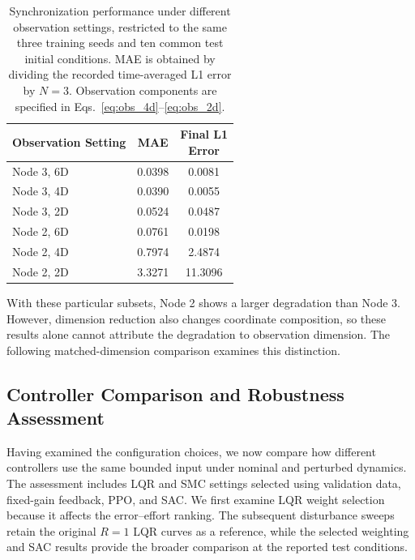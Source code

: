 \documentclass[a4paper,fleqn]{cas-dc}
\theoremstyle{plain}
\theoremstyle{definition}
\begin{document}
\begin{table}[pos=h,width=\linewidth]
	\centering
	\setlength{\tabcolsep}{3pt}
	\renewcommand{\arraystretch}{1.12}
	\caption{Synchronization performance under different observation settings, restricted to the same three training seeds and ten common test initial conditions. MAE is obtained by dividing the recorded time-averaged L1 error by $N=3$. Observation components are specified in Eqs.~\ref{eq:obs_4d}--\ref{eq:obs_2d}.}
	\label{tab:partial_observation}
	\begin{tabular}{@{}lcc@{}}
		\toprule
		Observation Setting & MAE & \makecell{Final L1\\Error} \\
		\midrule
		Node 3, 6D & 0.0398 & 0.0081 \\
		Node 3, 4D & 0.0390 & 0.0055 \\
		Node 3, 2D & 0.0524 & 0.0487 \\
		Node 2, 6D & 0.0761 & 0.0198 \\
		Node 2, 4D & 0.7974 & 2.4874 \\
		Node 2, 2D & 3.3271 & 11.3096 \\
		\bottomrule
	\end{tabular}
\end{table}

With these particular subsets, Node 2 shows a larger degradation than Node 3. However, dimension reduction also changes coordinate composition, so these results alone cannot attribute the degradation to observation dimension. The following matched-dimension comparison examines this distinction.









\subsection{Controller Comparison and Robustness Assessment}
\label{subsec:robustness_tests}

Having examined the configuration choices, we now compare how different controllers use the same bounded input under nominal and perturbed dynamics. The assessment includes LQR and SMC settings selected using validation data, fixed-gain feedback, PPO, and SAC. We first examine LQR weight selection because it affects the error--effort ranking. The subsequent disturbance sweeps retain the original $R=1$ LQR curves as a reference, while the selected weighting and SAC results provide the broader comparison at the reported test conditions.
\end{document}
